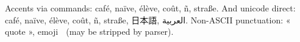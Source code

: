 \documentclass{article}
\begin{document}
Accents via commands: caf\'e, na\"ive, \'el\`eve, co\^ut, \~n, stra\ss e.
And unicode direct: café, naïve, élève, coût, ñ, straße, 日本語, العربية.
Non-ASCII punctuation: « quote », emoji 🚀 (may be stripped by parser).
\end{document}
